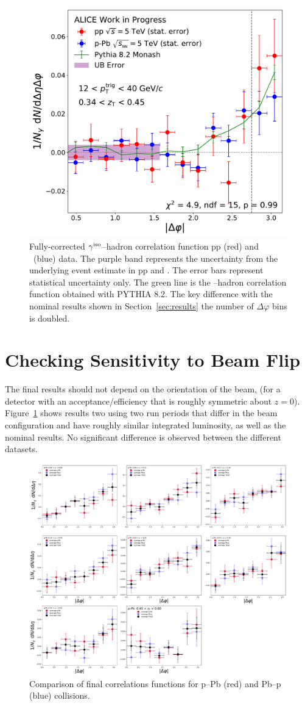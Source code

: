 \begin{figure}
\includegraphics[width = 0.24 \textwidth]{G-H_New/16_dPhi/Cs_Final_Indv_pT_0_zT_6.pdf}
\caption{Fully-corrected $\gamma^\mathrm{iso}$--hadron correlation function pp (red) and \pPb~(blue) data. The purple band represents the uncertainty from the underlying event estimate in pp and \pPb. The error bars represent statistical uncertainty only. The green line is the \gammaiso--hadron correlation function obtained with \textsc{PYTHIA 8.2}. The key difference with the nominal results shown in Section~\ref{sec:results} the number of $\Delta\varphi$ bins is doubled.}
\end{figure}


\section{Checking Sensitivity to Beam Flip}
The final results should not depend on the orientation of the beam, (for a detector with an acceptance/efficiency that is roughly symmetric about $z=0$). Figure~\ref{fig:Cs_Beam_Flip} shows results two using two run periods that differ in the beam configuration and have roughly similar integrated luminosity, as well as the nominal results. No significant difference is observed between the different datasets. 

\begin{figure}[hbtp]
\centering
\includegraphics[width = 0.9 \textwidth]{G-H_New/Cs_Averages_p-Pb_Beam_Flip.pdf}
\caption{Comparison of final correlations functions for p--Pb (red) and Pb--p (blue) collisions.}
\label{fig:Cs_Beam_Flip}
\end{figure}



